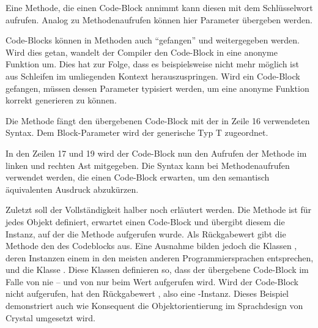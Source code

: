 Eine Methode, die einen Code-Block annimmt kann diesen mit dem Schlüsselwort
 aufrufen.  Analog zu Methodenaufrufen können hier Parameter
übergeben werden.

Code-Blocks können in Methoden auch \enquote{gefangen} und weitergegeben werden.
Wird dies getan, wandelt der Compiler den Code-Block in eine anonyme Funktion
um.  Dies hat zur Folge, dass es beispielsweise nicht mehr möglich ist aus
Schleifen im umliegenden Kontext herauszuspringen.  Wird ein Code-Block
gefangen, müssen dessen Parameter typisiert werden, um eine anonyme Funktion
korrekt generieren zu können.

Die Methode  fängt den übergebenen Code-Block mit der in Zeile 16
verwendeten Syntax.  Dem Block-Parameter wird der generische Typ T
zugeordnet.

In den Zeilen 17 und 19 wird der Code-Block nun den Aufrufen der Methode
 im linken und rechten Ast mitgegeben.  Die Syntax
 kann bei Methodenaufrufen verwendet werden, die
einen Code-Block erwarten, um den semantisch äquivalenten Ausdruck
 abzukürzen.

Zuletzt soll der Vollständigkeit halber noch  erläutert werden.  Die
Methode  ist für jedes Objekt definiert, erwartet einen Code-Block und
übergibt diesem die Instanz, auf der die Methode aufgerufen wurde.  Als
Rückgabewert gibt die Methode den des Codeblocks aus.  Eine Ausnahme bilden
jedoch die Klassen , deren Instanzen einem  in den meisten
anderen Programmiersprachen entsprechen, und die Klasse .  Diese
Klassen definieren  so, dass der übergebene Code-Block im Falle von
 nie -- und von  nur beim Wert  aufgerufen
wird.  Wird der Code-Block nicht aufgerufen, hat  den Rückgabewert
, also eine -Instanz.  Dieses Beispiel demonstriert auch wie
Konsequent die Objektorientierung im Sprachdesign von  Crystal umgesetzt wird.
